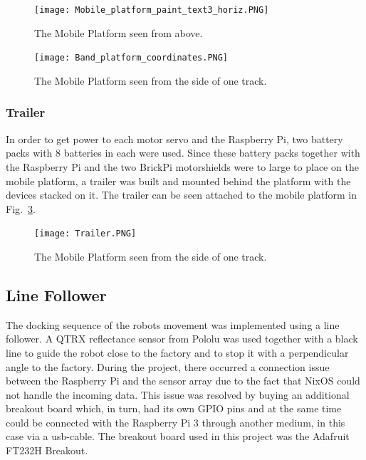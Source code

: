 \begin{figure}[H]
    \centering
    \texttt{[image: Mobile\_platform\_paint\_text3\_horiz.PNG]}
    \caption{The Mobile Platform seen from above.}
    \label{Mobile_platform_paint_}
\end{figure}


\begin{figure}[H]
    \centering
    \texttt{[image: Band\_platform\_coordinates.PNG]}
    \caption{The Mobile Platform seen from the side of one track.}
    \label{Band_platform_coordinates}
\end{figure}

\subsubsection{Trailer}
In order to get power to each motor servo and the Raspberry Pi, two battery packs with 8 batteries in each were used. Since these battery packs together with the Raspberry Pi and the two BrickPi motorshields were to large to place on the mobile platform, a trailer was built and mounted behind the platform with the devices stacked on it. The trailer can be seen attached to the mobile platform in Fig.~\ref{Trailer}.

\begin{figure}[H]
    \centering
    \texttt{[image: Trailer.PNG]}
    \caption{The Mobile Platform seen from the side of one track.}
    \label{Trailer}
\end{figure}

\subsection{Line Follower}

The docking sequence of the robots movement was implemented using a line follower. A QTRX reflectance sensor from Pololu was used together with a black line to guide the robot close to the factory and to stop it with a perpendicular angle to the factory. During the project, there occurred a connection issue between the Raspberry Pi and the sensor array due to the fact that  NixOS could not handle the incoming data. This issue was resolved by buying an additional breakout board which, in turn, had its own GPIO pins and at the same time could be connected with the Raspberry Pi 3 through another medium, in this case via a usb-cable. The breakout board used in this project was the Adafruit FT232H Breakout.

